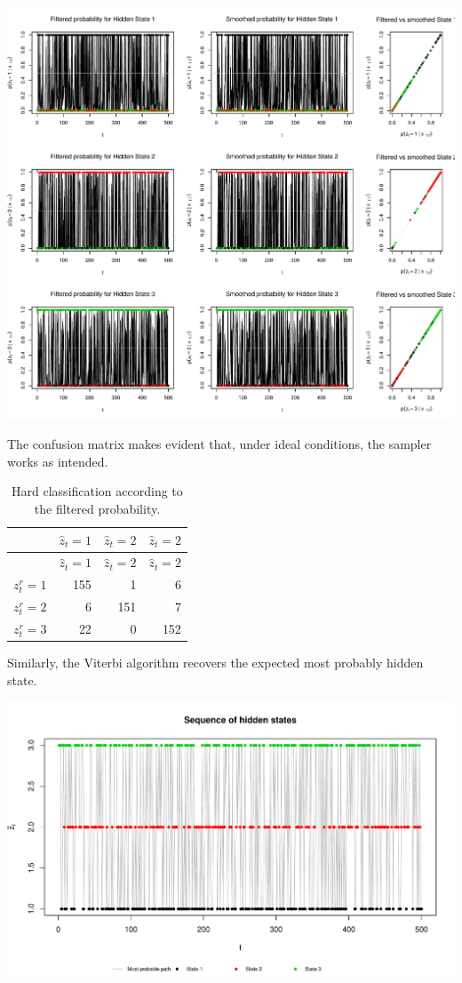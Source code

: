 \documentclass[]{article}
\begin{document}
\includegraphics[width=\textwidth]{main_pdf_files/figure-latex/iohmm_walkthrough_stateprobability-1}

The confusion matrix makes evident that, under ideal conditions, the
sampler works as intended.

\begin{longtable}[]{@{}lrrr@{}}
\caption{Hard classification according to the filtered
probability.}\tabularnewline
\toprule
& \(\hat{z}_t = 1\) & \(\hat{z}_t = 2\) &
\(\hat{z}_t = 2\)\tabularnewline
\midrule
\endfirsthead
\toprule
& \(\hat{z}_t = 1\) & \(\hat{z}_t = 2\) &
\(\hat{z}_t = 2\)\tabularnewline
\midrule
\endhead
\(z^r_t = 1\) & 155 & 1 & 6\tabularnewline
\(z^r_t = 2\) & 6 & 151 & 7\tabularnewline
\(z^r_t = 3\) & 22 & 0 & 152\tabularnewline
\bottomrule
\end{longtable}

Similarly, the Viterbi algorithm recovers the expected most probably
hidden state.

\includegraphics[width=\textwidth]{main_pdf_files/figure-latex/iohmm_walkthrough_statepath-1}
\end{document}
